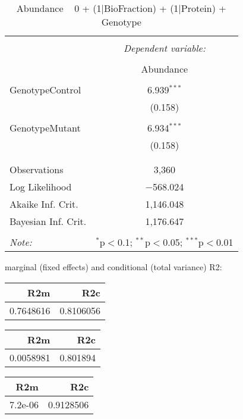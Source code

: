 \documentclass[11pt]{report}
\begin{document}
\begin{table}[!htbp] \centering 
  \caption{Abundance ~ 0 + (1|BioFraction) + (1|Protein) + Genotype} 
  \label{} 
\begin{tabular}{@{\extracolsep{5pt}}lc} 
\\[-1.8ex]\hline 
\hline \\[-1.8ex] 
 & \multicolumn{1}{c}{\textit{Dependent variable:}} \\ 
\cline{2-2} 
\\[-1.8ex] & Abundance \\ 
\hline \\[-1.8ex] 
 GenotypeControl & 6.939$^{***}$ \\ 
  & (0.158) \\ 
  & \\ 
 GenotypeMutant & 6.934$^{***}$ \\ 
  & (0.158) \\ 
  & \\ 
\hline \\[-1.8ex] 
Observations & 3,360 \\ 
Log Likelihood & $-$568.024 \\ 
Akaike Inf. Crit. & 1,146.048 \\ 
Bayesian Inf. Crit. & 1,176.647 \\ 
\hline 
\hline \\[-1.8ex] 
\textit{Note:}  & \multicolumn{1}{r}{$^{*}$p$<$0.1; $^{**}$p$<$0.05; $^{***}$p$<$0.01} \\ 
\end{tabular} 
\end{table} 
marginal (fixed effects) and conditional (total variance) R2:

\begin{tabular}{r|r}
\hline
R2m & R2c\\
\hline
0.7648616 & 0.8106056\\
\hline
\end{tabular}

\begin{tabular}{r|r}
\hline
R2m & R2c\\
\hline
0.0058981 & 0.801894\\
\hline
\end{tabular}

\begin{tabular}{r|r}
\hline
R2m & R2c\\
\hline
7.2e-06 & 0.9128506\\
\hline
\end{tabular}
\end{document}
